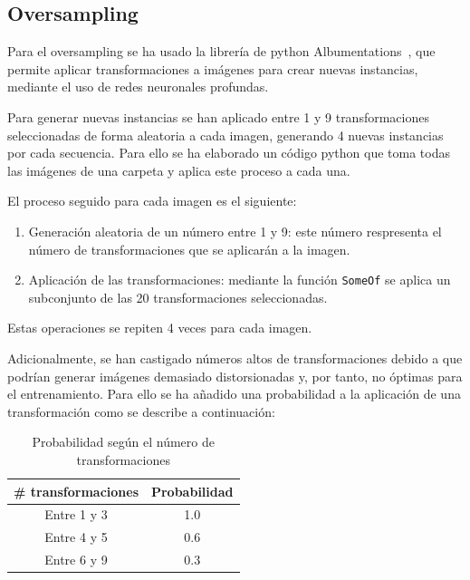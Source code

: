 \documentclass[12pt]{report} %
\begin{document}
    \subsection{Oversampling}

    Para el oversampling se ha usado la librería de python
    Albumentations~\cite{albumentations}, que permite aplicar transformaciones a imágenes
    para crear nuevas instancias, mediante el uso de redes neuronales profundas.
    
    Para generar nuevas instancias se han aplicado entre 1 y 9 transformaciones
    seleccionadas de forma aleatoria a cada imagen, generando 4
    nuevas instancias por cada secuencia. Para ello se ha elaborado un código
    python que toma todas las imágenes de una carpeta y aplica este proceso a
    cada una.

    El proceso seguido para cada imagen es el siguiente: 
    \begin{enumerate}
        \item Generación aleatoria de un número entre 1 y 9: este número respresenta el número de transformaciones que se aplicarán a la imagen.
        \item Aplicación de las transformaciones: mediante la función \texttt{SomeOf} se aplica un subconjunto de las 20 transformaciones seleccionadas.
    \end{enumerate}
    Estas operaciones se repiten 4 veces para cada imagen.

    Adicionalmente, se han castigado números altos de transformaciones debido a
    que podrían generar imágenes demasiado distorsionadas y, por tanto, no
    óptimas para el entrenamiento. Para ello se ha añadido una probabilidad a
    la aplicación de una transformación como se describe a continuación:

    \begin{table}[H]
    \centering
        \begin{tabular}{cc}
        \toprule
        \textbf{\# transformaciones} & \textbf{Probabilidad} \\
        \midrule
        Entre 1 y 3 & 1.0\\
        Entre 4 y 5 & 0.6\\
        Entre 6 y 9 & 0.3\\
        \bottomrule
        \end{tabular}
    \caption{Probabilidad según el número de transformaciones}
    \end{table}

\end{document}
